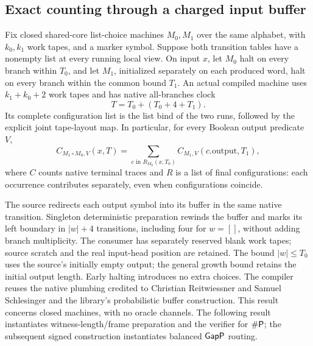 \begin{result}
\subsection{Exact counting through a charged input buffer}
Fix closed shared-core list-choice machines $M_0,M_1$ over the same alphabet,
with $k_0,k_1$ work tapes, and a marker symbol. Suppose both transition tables
have a nonempty list at every running local view. On input $x$, let $M_0$ halt
on every branch within $T_0$, and let $M_1$, initialized separately on each
produced word, halt on every branch within the common bound $T_1$. An actual
compiled machine uses $k_1+k_0+2$ work tapes and has native all-branches clock
\[
 T=T_0+(T_0+4+T_1).
\]
Its complete configuration list is the list bind of the two runs, followed by
the explicit joint tape-layout map. In particular, for every Boolean output
predicate $V$,
\[
 C_{M_1\circ M_0,V}(x,T)
   =\sum_{c\text{ in }R_{M_0}(x,T_0)} C_{M_1,V}(c.\mathrm{output},T_1),
\]
where $C$ counts native terminal traces and $R$ is a list of final configurations:
each occurrence contributes separately, even when configurations coincide.

The source redirects each output symbol into its buffer in the same native
transition. Singleton deterministic preparation rewinds the buffer and marks its
left boundary in $|w|+4$ transitions, including four for $w=[]$, without adding
branch multiplicity. The consumer has separately reserved blank work tapes;
source scratch and the real input-head position are retained. The bound
$|w|\le T_0$ uses the source's initially empty output; the general growth bound
retains the initial output length. Early halting introduces no extra choices.
The compiler reuses the native plumbing credited to Christian Reitwiessner and
Samuel Schlesinger and the library's probabilistic buffer construction. This
result concerns closed machines, with no oracle channels. The following result
instantiates witness-length/frame preparation and the verifier for $\#\mathsf{P}$;
the subsequent signed construction instantiates balanced $\mathsf{GapP}$ routing.
\end{result}

